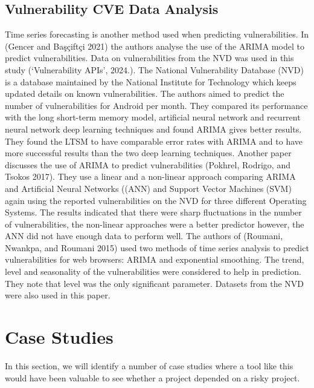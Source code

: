 \documentclass[10pt, compsoc, conference]{IEEEtran}
\begin{document}
\subsection{Vulnerability CVE Data Analysis}
Time series forecasting is another method used when predicting vulnerabilities. In (Gencer and Başçiftçi 2021) the authors analyse the use of the ARIMA model to predict vulnerabilities. Data on vulnerabilities from the NVD was used in this study (‘Vulnerability APIs’, 2024.). The National Vulnerability Database (NVD) is a database maintained by the National Institute for Technology which keeps updated details on known vulnerabilities. The authors aimed to predict the number of vulnerabilities for Android per month. They compared its performance with the long short-term memory model, artificial neural network and recurrent neural network deep learning techniques and found ARIMA gives better results. They found the LTSM to have comparable error rates with ARIMA and to have more successful results than the two deep learning techniques. Another paper discusses the use of ARIMA to predict vulnerabilities (Pokhrel, Rodrigo, and Tsokos 2017). They use a linear and a non-linear approach comparing ARIMA and Artificial Neural Networks ((ANN) and Support Vector Machines (SVM) again using the reported vulnerabilities on the NVD for three different Operating Systems. The results indicated that there were sharp fluctuations in the number of vulnerabilities, the non-linear approaches were a better predictor however, the ANN did not have enough data to perform well. The authors of (Roumani, Nwankpa, and Roumani 2015) used two methods of time series analysis to predict vulnerabilities for web browsers: ARIMA and exponential smoothing. The trend, level and seasonality of the vulnerabilities were considered to help in prediction. They note that level was the only significant parameter. Datasets from the NVD were also used in this paper.

\section{Case Studies}
In this section, we will identify a number of case studies where a tool like this would have been valuable to see whether a project depended on a risky project. 
\end{document}

